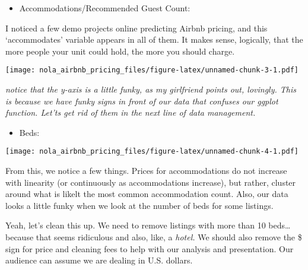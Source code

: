 \documentclass[]{article}
\newenvironment{Shaded}{\begin{snugshade}}{\end{snugshade}}
\newcommand{\CharTok}[1]{\textcolor[rgb]{0.31,0.60,0.02}{#1}}
\newcommand{\CommentTok}[1]{\textcolor[rgb]{0.56,0.35,0.01}{\textit{#1}}}
\newcommand{\DecValTok}[1]{\textcolor[rgb]{0.00,0.00,0.81}{#1}}
\newcommand{\KeywordTok}[1]{\textcolor[rgb]{0.13,0.29,0.53}{\textbf{#1}}}
\newcommand{\NormalTok}[1]{#1}
\newcommand{\OperatorTok}[1]{\textcolor[rgb]{0.81,0.36,0.00}{\textbf{#1}}}
\newcommand{\StringTok}[1]{\textcolor[rgb]{0.31,0.60,0.02}{#1}}
\providecommand{\tightlist}{%
  \setlength{\itemsep}{0pt}\setlength{\parskip}{0pt}}
\begin{document}
\begin{itemize}
\tightlist
\item
  Accommodations/Recommended Guest Count:
\end{itemize}

I noticed a few demo projects online predicting Airbnb pricing, and this
`accommodates' variable appears in all of them. It makes sense,
logically, that the more people your unit could hold, the more you
should charge.

\texttt{[image: nola\_airbnb\_pricing\_files/figure-latex/unnamed-chunk-3-1.pdf]}

\emph{notice that the y-axis is a little funky, as my girlfriend points
out, lovingly. This is because we have funky signs in front of our data
that confuses our ggplot function. Let'ts get rid of them in the next
line of data management.}

\begin{itemize}
\tightlist
\item
  Beds:
\end{itemize}

\texttt{[image: nola\_airbnb\_pricing\_files/figure-latex/unnamed-chunk-4-1.pdf]}

From this, we notice a few things. Prices for accommodations do not
increase with linearity (or continuously as accommodations increase),
but rather, cluster around what is likelt the most common accommodation
count. Also, our data looks a little funky when we look at the number of
beds for some listings.

Yeah, let's clean this up. We need to remove listings with more than 10
beds\ldots{} because that seems ridiculous and also, like, a
\emph{hotel.} We should also remove the \$ sign for price and cleaning
fees to help with our analysis and presentation. Our audience can assume
we are dealing in U.S. dollars.

\begin{Shaded}
\end{Shaded}
\end{document}
